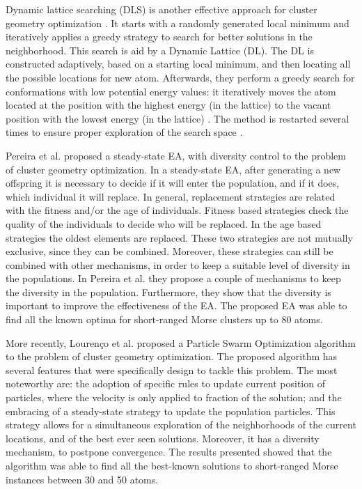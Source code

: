 		Dynamic lattice searching (DLS) is another effective approach for cluster geometry optimization \cite{cheng07}. It starts with a randomly generated local minimum and iteratively applies a greedy strategy to search for better solutions in the neighborhood. This search is aid by a Dynamic Lattice (DL). The DL is constructed adaptively, based on a starting local minimum, and then locating all the possible locations for new atom. Afterwards, they perform a greedy search for conformations with low potential energy values: it iteratively moves the atom located at the position with the highest energy (in the lattice) to the vacant position with the lowest energy (in the lattice) \cite{cheng07, shao04}. The method is restarted several times to ensure proper exploration of the search space \cite{cheng07}.
			
		Pereira et al.\cite{xico09} proposed a steady-state EA, with diversity control to the problem of cluster geometry optimization. In a steady-state EA, after generating a new offspring it is necessary to decide if it will enter the population, and if it does, which individual it will replace. In general, replacement strategies are related with the fitness and/or the age of individuals. Fitness based strategies check the quality of the individuals to decide who will be replaced. In the age based strategies the oldest elements are replaced. These two strategies are not mutually exclusive, since they can be combined. Moreover, these strategies can still be combined with other mechanisms, in order to keep a suitable level of diversity in the populations.
		In Pereira et al.\cite{xico09} they propose a couple of mechanisms to keep the diversity in the population. Furthermore, they show that the diversity is important to improve the effectiveness of the EA. The proposed EA was able to find all the known optima for short-ranged Morse clusters up to 80 atoms.
		
		More recently, Lourenço et al. \cite{lourenco11} proposed a Particle Swarm Optimization algorithm to the problem of cluster geometry optimization. The proposed algorithm has several features that were specifically design to tackle this problem. The most noteworthy are: the adoption of specific rules to update current position of particles, where the velocity is only applied to fraction of the solution; and the embracing of a steady-state strategy to update the population particles. This strategy allows for a simultaneous exploration of the neighborhoods of the current locations, and of the best ever seen solutions. Moreover, it has a diversity mechanism, to postpone convergence.
 		The results presented showed that the algorithm was able to find all the best-known solutions to short-ranged Morse instances between 30 and 50 atoms.
		

